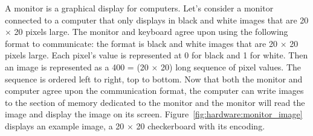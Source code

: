 \begin{example}
A monitor is a graphical display for computers. Let's consider a monitor connected to a computer that only displays in black and white images that are 20 $\times$ 20 pixels large.  The monitor and keyboard agree upon using the following format to communicate: the format is black and white images that are 20 $\times$ 20 pixels large. Each pixel's value is represented at 0 for black and 1 for white. Then an image is represented as a 400 = (20 $\times$ 20) long sequence of pixel values. The sequence is ordered left to right, top to bottom. Now that both the monitor and computer agree upon the communication format, the computer can write images to the section of memory dedicated to the monitor and the monitor will read the image and display the image on its screen. Figure~\ref{fig:hardware:monitor_image} displays an example image, a  20 $\times$ 20 checkerboard with its encoding. 
\end{example}

